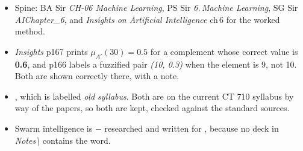 \begin{itemize}
  \item Spine: BA Sir \emph{CH-06 Machine Learning}, PS Sir \emph{6.\,Machine Learning},
        SG Sir \emph{AIChapter\_6}, and \emph{Insights on Artificial Intelligence} ch\,6
        for the worked method.
  \item {} \emph{Insights}
        p167 prints $\mu_{A'}(30)=0.5$ for a complement whose correct value is
        \textbf{0.6}, and p166 labels a fuzzified pair \emph{(10, 0.3)} when the element
        is 9, not 10. Both are shown correctly there, with a note.
  \item {}, which is labelled \emph{old syllabus}. Both are on the current
        CT 710 syllabus by way of the papers, so both are kept, checked against the
        standard sources.
  \item Swarm intelligence is \added{} $-$ researched and written for
        , because no deck in \emph{Notes\textbackslash} contains the
        word.
\end{itemize}
